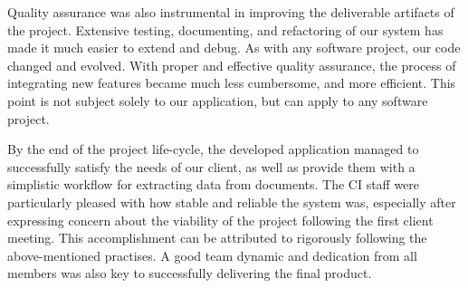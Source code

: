 \documentclass{l3proj}
\begin{document}
Quality assurance was also instrumental in improving the deliverable artifacts of the project. Extensive testing, documenting, and refactoring of our system has made it much easier to extend and debug. As with any software project, our code changed and evolved. With proper and effective quality assurance, the process of integrating new features became much less cumbersome, and more efficient. This point is not subject solely to our application, but can apply to any software project.

By the end of the project life-cycle, the developed application managed to successfully satisfy the needs of our client, as well as provide them with a simplistic workflow for extracting data from documents. The CI staff were particularly pleased with how stable and reliable the system was, especially after expressing concern about the viability of the project following the first client meeting. This accomplishment can be attributed to rigorously following the above-mentioned practises. A good team dynamic and dedication from all members was also key to successfully delivering the final product\cite{Team_Dynamic}.

\newpage


\end{document}
